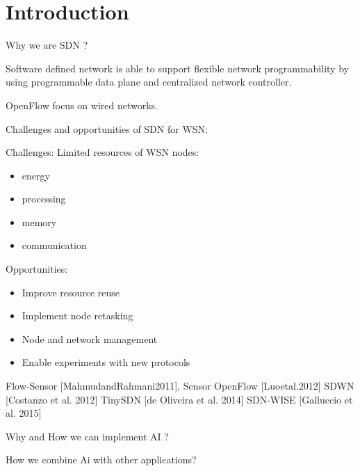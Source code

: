 \section{Introduction}

Why we are SDN ?

Software defined network is able to support flexible network programmability 
by using programmable data plane and centralized network controller.

OpenFlow focus on wired networks.

Challenges and opportunities of SDN for WSN:

Challenges: Limited resources of WSN nodes:
\begin{itemize}
\item	energy
\item	processing
\item	memory
\item	communication
\end{itemize}

Opportunities: 
\begin{itemize}
\item	Improve resource reuse
\item	Implement node retasking 
\item	Node and network management
\item	Enable experiments with new protocols
\end{itemize}






Flow-Sensor [MahmudandRahmani2011], 
Sensor OpenFlow [Luoetal.2012] 
SDWN [Costanzo et al. 2012]
TinySDN [de Oliveira et al. 2014]
SDN-WISE [Galluccio et al. 2015]

Why and How we can implement AI ?

How we combine Ai with other applications?
